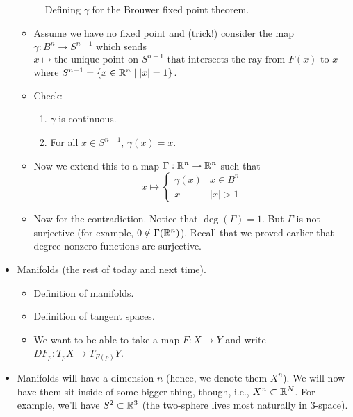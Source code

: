 \documentclass[../notes.tex]{subfiles}
\begin{document}
\begin{itemize}
\begin{figure}[H]
        \caption{Defining $\gamma$ for the Brouwer fixed point theorem.}
        \label{fig:Brouwer}
    \end{figure}
    \begin{itemize}
        \item Assume we have no fixed point and (trick!) consider the map $\gamma:B^n\to S^{n-1}$ which sends $x\mapsto\text{the unique point on }S^{n-1}\text{ that intersects the ray from }F(x)\text{ to }x$ where $S^{n-1}=\{x\in\mathbb{R}^n\mid |x|=1\}$.
        \item Check:
        \begin{enumerate}
            \item $\gamma$ is continuous.
            \item For all $x\in S^{n-1}$, $\gamma(x)=x$.
        \end{enumerate}
        \item Now we extend this to a map $\Gamma:\mathbb{R}^n\to\mathbb{R}^n$ such that
        \begin{equation*}
            x \mapsto
            \begin{cases}
                \gamma(x) & x\in B^n\\
                x & |x|>1
            \end{cases}
        \end{equation*}
        \item Now for the contradiction. Notice that $\deg(\Gamma)=1$. But $\Gamma$ is not surjective (for example, $0\notin\Gamma(\mathbb{R}^n)$). Recall that we proved earlier that degree nonzero functions are surjective.
    \end{itemize}
    \item Manifolds (the rest of today and next time).
    \begin{itemize}
        \item Definition of manifolds.
        \item Definition of tangent spaces.
        \item We want to be able to take a map $F:X\to Y$ and write $DF_p:T_pX\to T_{F(p)}Y$.
    \end{itemize}
    \item Manifolds will have a dimension $n$ (hence, we denote them $X^n$). We will now have them sit inside of some bigger thing, though, i.e., $X^n\subset\mathbb{R}^N$. For example, we'll have $S^2\subset\mathbb{R}^3$ (the two-sphere lives most naturally in 3-space).

\end{itemize}
\end{document}
